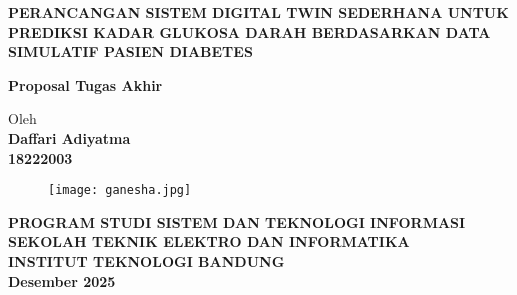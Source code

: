 \documentclass[12pt,a4paper,oneside]{book}
\begin{document}
\begin{titlepage}
\begin{center}

    
    \vspace*{3cm}
    
    {\Large\bfseries PERANCANGAN SISTEM DIGITAL TWIN SEDERHANA UNTUK PREDIKSI KADAR GLUKOSA DARAH BERDASARKAN DATA SIMULATIF PASIEN DIABETES}\\
     \vspace{3cm}

    {\Large \textbf{Proposal Tugas Akhir}}\\


    \vspace{1cm}
    
    
    {\large Oleh}\\[0.3cm]
    \textbf{
    {\large Daffari Adiyatma}\\
    {\large 18222003}
    }\\

    \vspace{2cm}
    
    \begin{figure}[h]
    \centering
    \texttt{[image: ganesha.jpg]}
    \end{figure}
    
    
     \vspace{1cm}

    \textbf{
    {\large PROGRAM STUDI SISTEM DAN TEKNOLOGI INFORMASI}\\
    {\large SEKOLAH TEKNIK ELEKTRO DAN INFORMATIKA}\\
    {\large INSTITUT TEKNOLOGI BANDUNG}\\
    {\large Desember 2025}
    }
\end{center}
\end{titlepage}
\end{document}
